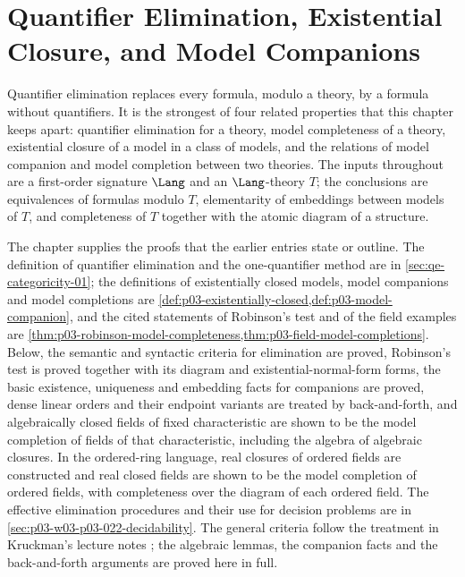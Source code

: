 \chapter{Quantifier Elimination, Existential Closure, and Model Companions}
\label{sec:p03-w03-p03-020-qe}

Quantifier elimination replaces every formula, modulo a theory, by a formula
without quantifiers. It is the strongest of four related properties that this
chapter keeps apart: quantifier elimination for a theory, model completeness
of a theory, existential closure of a model in a class of models, and the
relations of model companion and model completion between two theories. The
inputs throughout are a first-order signature \(\Lang\) and an
\(\Lang\)-theory \(T\); the conclusions are equivalences of formulas modulo
\(T\), elementarity of embeddings between models of \(T\), and completeness of
\(T\) together with the atomic diagram of a structure.

The chapter supplies the proofs that the earlier entries state or outline.
The definition of quantifier elimination and the one-quantifier method are in
\cref{sec:qe-categoricity-01}; the definitions of existentially closed models,
model companions and model completions are
\cref{def:p03-existentially-closed,def:p03-model-companion}, and the cited
statements of Robinson's test and of the field examples are
\cref{thm:p03-robinson-model-completeness,thm:p03-field-model-completions}.
Below, the semantic and syntactic criteria for elimination are proved, Robinson's
test is proved together with its diagram and existential-normal-form forms, the
basic existence, uniqueness and embedding facts for companions are proved,
dense linear orders and their endpoint variants are treated by back-and-forth,
and algebraically closed fields of fixed characteristic are shown to be the
model completion of fields of that characteristic, including the algebra of
algebraic closures. In the ordered-ring language, real closures of ordered
fields are constructed and real closed fields are shown to be the model
completion of ordered fields, with completeness over the diagram of each
ordered field. The effective elimination procedures and their use for
decision problems are in \cref{sec:p03-w03-p03-022-decidability}. The general
criteria follow the treatment in Kruckman's lecture notes
\cite[sec.~2.2--2.3, pp.~16--22]{Kruckman2020}; the algebraic lemmas, the
companion facts and the back-and-forth arguments are proved here in full.

